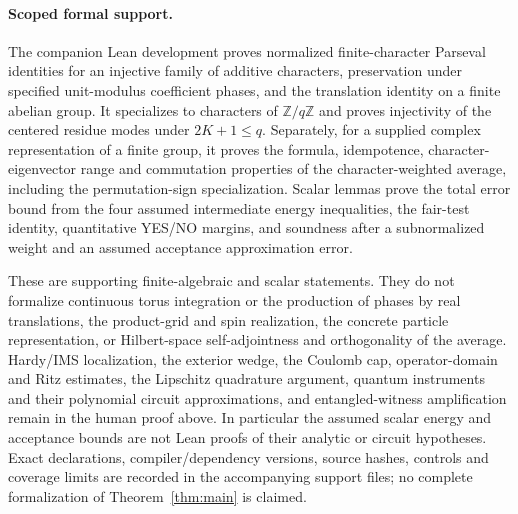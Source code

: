 \paragraph{Scoped formal support.}
The companion Lean development proves normalized finite-character Parseval
identities for an injective family of additive characters, preservation under
specified unit-modulus coefficient phases, and the translation identity on a
finite abelian group. It specializes to characters of $\mathbb Z/q\mathbb Z$
and proves injectivity of the centered residue modes under
$2K+1\leq q$. Separately, for a supplied complex representation of a finite
group, it proves the formula, idempotence, character-eigenvector range and
commutation properties of the character-weighted average, including the
permutation-sign specialization. Scalar lemmas prove the total error bound
from the four assumed intermediate energy inequalities, the fair-test
identity, quantitative YES/NO margins, and soundness after a subnormalized
weight and an assumed acceptance approximation error.

These are supporting finite-algebraic and scalar statements. They do not
formalize continuous torus integration or the production of phases by real
translations, the product-grid and spin realization, the concrete particle
representation, or Hilbert-space self-adjointness and orthogonality of the
average. Hardy/IMS localization, the exterior wedge, the Coulomb cap,
operator-domain and Ritz estimates, the Lipschitz quadrature argument,
quantum instruments and their polynomial circuit approximations, and
entangled-witness amplification remain in the human proof above. In
particular the assumed scalar energy and acceptance bounds are not Lean
proofs of their analytic or circuit hypotheses. Exact declarations,
compiler/dependency versions, source hashes, controls and coverage limits
are recorded in the accompanying support files; no complete formalization
of Theorem~\ref{thm:main} is claimed.
